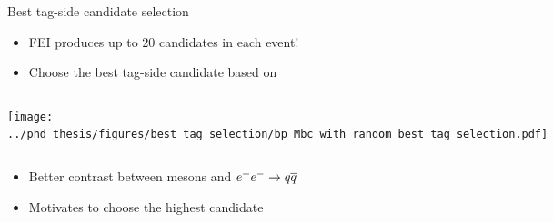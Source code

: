 \documentclass[xcolor=dvipsnames]{beamer}
\begin{document}
\begin{frame}{Best tag-side candidate selection}
\scriptsize\centering
   \begin{itemize}
      \item    FEI produces up to 20 candidates in each event!
      \item[\ra] Choose the best tag-side candidate based on \feiProb
   \end{itemize}

\begin{columns}
   \centering
   \texttt{[image: ../phd\_thesis/figures/best\_tag\_selection/bp\_Mbc\_with\_random\_best\_tag\_selection.pdf]}
   \centering

\end{columns}

\begin{itemize}
   \item[\ra] Better contrast between \B mesons and $e^+e^-\rightarrow q\overline q$
   \item Motivates to choose the highest \feiProb candidate
\end{itemize}

\end{frame}
\end{document}

